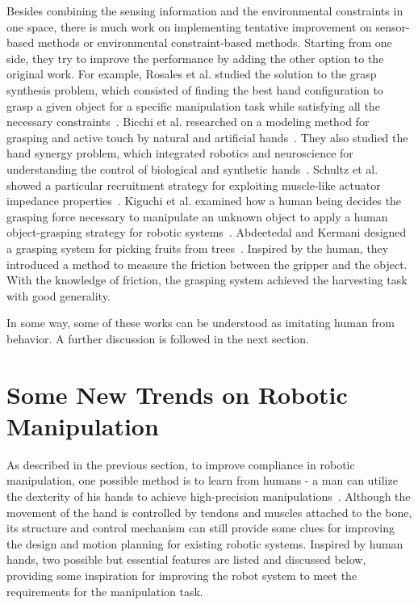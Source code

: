 \documentclass[journal,twoside,web]{ieeecolor}
\begin{document}
Besides combining the sensing information and the environmental constraints in one space, there is much work on implementing tentative improvement on sensor-based methods or environmental constraint-based methods. Starting from one side, they try to improve the performance by adding the other option to the original work. 
For example, 
Rosales et al. studied the solution to the grasp synthesis problem, which consisted of finding the best hand configuration to grasp a given object for a specific manipulation task while satisfying all the necessary constraints~\cite{Rosales2012}.
Bicchi et al. researched on a modeling method for grasping and active touch by natural and artificial hands~\cite{Bicchi2011}.
They also studied the hand synergy problem, which integrated robotics and neuroscience for understanding the control of biological and synthetic hands~\cite{Santello2016}.
Schultz et al. showed a particular recruitment strategy for exploiting muscle-like actuator impedance properties~\cite{Schultz2015}.
Kiguchi et al. examined how a human being decides the grasping force necessary to manipulate an unknown object to apply a human object-grasping strategy for robotic systems~\cite{Kiguchi2003}.
Abdeetedal and Kermani designed a grasping system for picking fruits from trees~\cite{Abdeetedal2018}. Inspired by the human, they introduced a method to measure the friction between the gripper and the object. With the knowledge of friction, the grasping system achieved the harvesting task with good generality.

In some way, some of these works can be understood as imitating human from behavior. A further discussion is followed in the next section.

\section{Some New Trends on Robotic Manipulation}
\label{sec:compliant_advanced}

As described in the previous section, to improve compliance in robotic manipulation, one possible method is to learn from humans - a man can utilize the dexterity of his hands to achieve high-precision manipulations~\cite{Wu2015}. 
Although the movement of the hand is controlled by tendons and muscles attached to the bone, its structure and control mechanism can still provide some clues for improving the design and motion planning for existing robotic systems. 
Inspired by human hands, two possible but essential features are listed and discussed below, providing some inspiration for improving the robot system to meet the requirements for the manipulation task.
\end{document}
